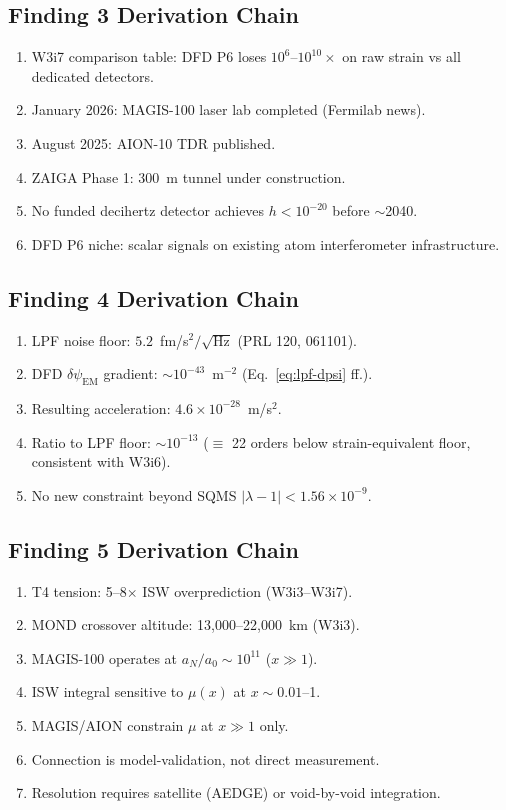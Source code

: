 \documentclass[11pt]{article}
\theoremstyle{definition}
\theoremstyle{remark}
\newcommand{\ee}[1]{\times10^{#1}}
\newcommand{\lambdaone}{|\lambda-1|}
\newcommand{\dpsiem}{\delta\psi_{\mathrm{EM}}}
\newcommand{\azero}{a_0}
\begin{document}
\subsection{Finding 3 Derivation Chain}

\begin{enumerate}[nosep]
\item W3i7 comparison table: DFD P6 loses $10^6$--$10^{10}\times$ on
  raw strain vs all dedicated detectors.
\item January 2026: MAGIS-100 laser lab completed (Fermilab news).
\item August 2025: AION-10 TDR published.
\item ZAIGA Phase 1: 300~m tunnel under construction.
\item No funded decihertz detector achieves $h < 10^{-20}$ before $\sim$2040.
\item DFD P6 niche: scalar signals on existing atom interferometer
  infrastructure.
\end{enumerate}

\subsection{Finding 4 Derivation Chain}

\begin{enumerate}[nosep]
\item LPF noise floor: $5.2$~fm/s$^2/\sqrt{\mathrm{Hz}}$ (PRL 120, 061101).
\item DFD $\dpsiem$ gradient: $\sim 10^{-43}$~m$^{-2}$ (Eq.~\ref{eq:lpf-dpsi} ff.).
\item Resulting acceleration: $4.6\ee{-28}$~m/s$^2$.
\item Ratio to LPF floor: $\sim 10^{-13}$ ($\equiv$ 22 orders below
  strain-equivalent floor, consistent with W3i6).
\item No new constraint beyond SQMS $\lambdaone < 1.56\ee{-9}$.
\end{enumerate}

\subsection{Finding 5 Derivation Chain}

\begin{enumerate}[nosep]
\item T4 tension: 5--8$\times$ ISW overprediction (W3i3--W3i7).
\item MOND crossover altitude: 13,000--22,000~km (W3i3).
\item MAGIS-100 operates at $a_N/\azero \sim 10^{11}$ ($x \gg 1$).
\item ISW integral sensitive to $\mu(x)$ at $x \sim 0.01$--1.
\item MAGIS/AION constrain $\mu$ at $x \gg 1$ only.
\item Connection is model-validation, not direct measurement.
\item Resolution requires satellite (AEDGE) or void-by-void integration.
\end{enumerate}
\end{document}
